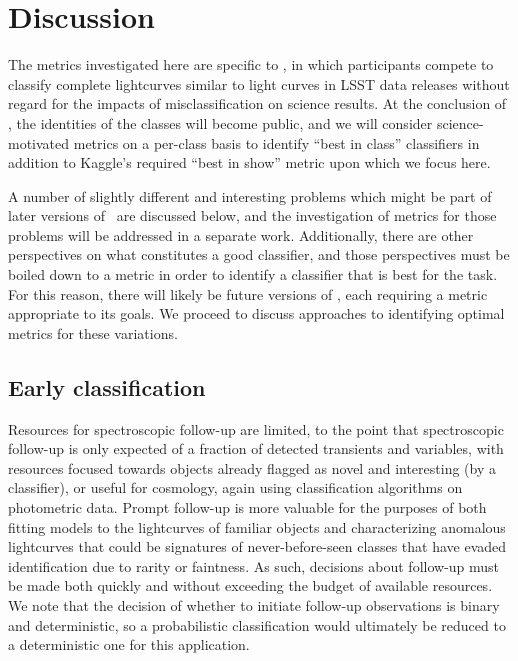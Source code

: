 \section{Discussion}
\label{sec:discussion}

The metrics investigated here are specific to \plasticc, in which participants compete to classify complete lightcurves similar to light curves in LSST data releases without regard for the impacts of misclassification on science results.
At the conclusion of \plasticc, the identities of the classes will become public, and we will consider science-motivated metrics on a per-class basis to identify ``best in class'' classifiers in addition to Kaggle's required ``best in show'' metric upon which we focus here.

A number of slightly different and interesting problems which might be part of later versions of \plasticc\ are discussed below, and the investigation of metrics for those problems will be addressed in a separate work.
Additionally, there are other perspectives on what constitutes a good classifier, and those perspectives must be boiled down to a metric in order to identify a classifier that is best for the task.
For this reason, there will likely be future versions of \plasticc, each requiring a metric appropriate to its goals.
We proceed to discuss approaches to identifying optimal metrics for these variations.

\subsection{Early classification}
\label{sec:early}

Resources for spectroscopic follow-up are limited, to the point that spectroscopic follow-up is only expected of a fraction of detected transients and variables, with resources focused towards objects already flagged as novel and interesting (by a classifier), or useful for cosmology, again using classification algorithms on photometric data.
Prompt follow-up is more valuable for the purposes of both fitting models to the lightcurves of familiar objects and characterizing anomalous lightcurves that could be signatures of never-before-seen classes that have evaded identification due to rarity or faintness.
As such, decisions about follow-up must be made both quickly and without exceeding the budget of available resources.
We note that the decision of whether to initiate follow-up observations is binary and deterministic, so a probabilistic classification would ultimately be reduced to a deterministic one for this application.

